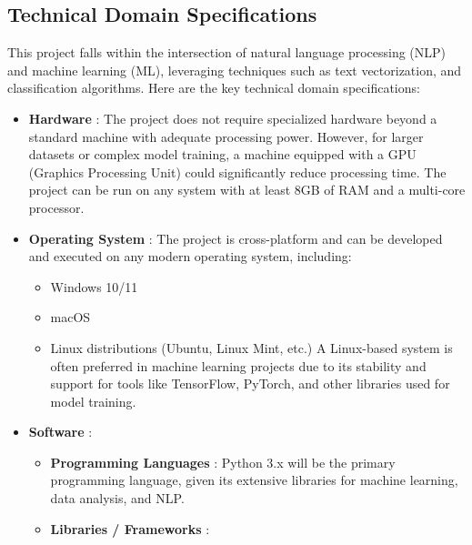 \subsection{Technical Domain Specifications}
\vspace{.1in}
This project falls within the intersection of natural language processing (NLP) and machine learning (ML), leveraging techniques such as text vectorization, and classification algorithms. Here are the key technical domain specifications:

\begin{itemize}
    
    \item \textbf{Hardware} : 
    \noindent
    The project does not require specialized hardware beyond a standard machine with adequate processing power. However, for larger datasets or complex model training, a machine equipped with a GPU (Graphics Processing Unit) could significantly reduce processing time. The project can be run on any system with at least 8GB of RAM and a multi-core processor.

    \item \textbf{Operating System} : 
    \noindent
    The project is cross-platform and can be developed and executed on any modern operating system, including:
        \begin{itemize}
            \item Windows 10/11
            \item macOS
            \item 
            \noindent
            Linux distributions (Ubuntu, Linux Mint, etc.) A Linux-based system is often preferred in machine learning projects due to its stability and support for tools like TensorFlow, PyTorch, and other libraries used for model training.
        \end{itemize}

    \item  \textbf{Software} :
    \noindent
        \begin{itemize}
            \item \textbf{Programming Languages} : 
            \noindent
            Python 3.x will be the primary programming language, given its extensive libraries for machine learning, data analysis, and NLP.

            \item \textbf{Libraries / Frameworks} :
            \noindent
                \begin{itemize}
                    

\end{itemize}
\end{itemize}
\end{itemize}
